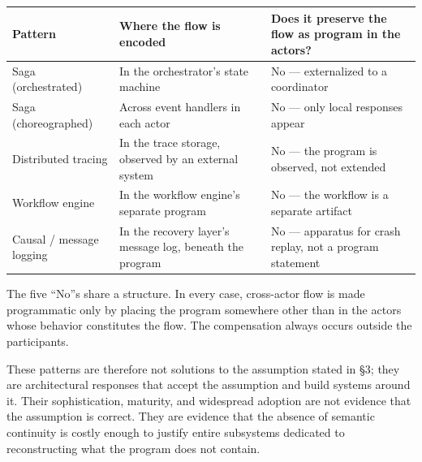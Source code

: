 \documentclass[
]{article}
\newcounter{none} %
\begin{document}
{\def\LTcaptype{none} %
\begin{longtable}[]{@{}
  >{\raggedright\arraybackslash}p{}
  >{\raggedright\arraybackslash}p{}
  >{\raggedright\arraybackslash}p{}@{}}
\toprule\noalign{}
\begin{minipage}[b]{\linewidth}\raggedright
Pattern
\end{minipage} & \begin{minipage}[b]{\linewidth}\raggedright
Where the flow is encoded
\end{minipage} & \begin{minipage}[b]{\linewidth}\raggedright
Does it preserve the flow as program in the actors?
\end{minipage} \\
\midrule\noalign{}
\endhead
\bottomrule\noalign{}
\endlastfoot
Saga (orchestrated) & In the orchestrator's state machine & No ---
externalized to a coordinator \\
Saga (choreographed) & Across event handlers in each actor & No --- only
local responses appear \\
Distributed tracing & In the trace storage, observed by an external
system & No --- the program is observed, not extended \\
Workflow engine & In the workflow engine's separate program & No --- the
workflow is a separate artifact \\
Causal / message logging & In the recovery layer's message log, beneath
the program & No --- apparatus for crash replay, not a program
statement \\
\end{longtable}
}

The five ``No''s share a structure. In every case, cross-actor flow is
made programmatic only by placing the program somewhere other than in
the actors whose behavior constitutes the flow. The compensation always
occurs outside the participants.

These patterns are therefore not solutions to the assumption stated in
§3; they are architectural responses that accept the assumption and
build systems around it. Their sophistication, maturity, and widespread
adoption are not evidence that the assumption is correct. They are
evidence that the absence of semantic continuity is costly enough to
justify entire subsystems dedicated to reconstructing what the program
does not contain.
\end{document}
